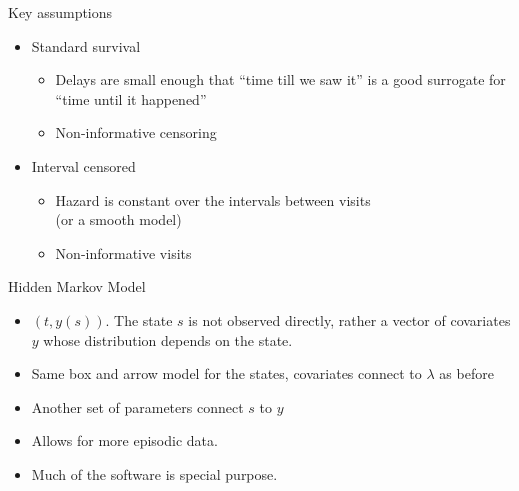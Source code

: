 \begin{frame}{Key assumptions}
  \begin{itemize}
    \item Standard survival
      \begin{itemize}
        \item Delays are small enough that ``time till we saw it'' is a good
          surrogate for ``time until it happened''
        \item Non-informative censoring
      \end{itemize}
    \item Interval censored
      \begin{itemize}
        \item Hazard is constant over the intervals between visits\\
          (or a smooth model)
        \item Non-informative visits
      \end{itemize}
  \end{itemize}
\end{frame}

\begin{frame}{Hidden Markov Model}
  \begin{itemize}
    \item $(t, y(s))$.  The state $s$ is not observed directly, rather a vector
      of covariates $y$ whose distribution depends on the state.
    \item Same box and arrow model for the states, covariates connect to
      $\lambda$ as before
    \item Another set of parameters connect $s$ to $y$
    \item Allows for more episodic data.
    \item Much of the software is special purpose.
  \end{itemize}
\end{frame}

\begin{frame}
\end{frame}

\begin{frame}
\end{frame}

\begin{frame}
\end{frame}

\begin{frame}
\end{frame}


